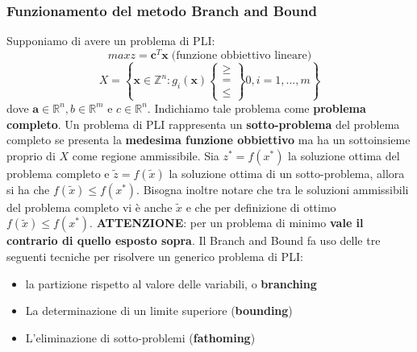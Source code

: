 \documentclass[12pt]{article}
\begin{document}
\subsubsection{Funzionamento del metodo Branch and Bound}
Supponiamo di avere un problema di PLI:
$$max z = \boldsymbol{c}^T\boldsymbol{x} \; \textrm{(funzione obbiettivo lineare)}$$
$$X = \left \{ \boldsymbol{x} \in \mathbb{Z}^n : g_i(\boldsymbol{x}) \begin{Bmatrix}
    \geq \\
    = \\
    \leq
\end{Bmatrix} 0, i = 1,...,m \right \}$$
dove $\boldsymbol{a} \in \mathbb{R}^n, b \in \mathbb{R}^m$ e $c \in \mathbb{R}^n$. \newline
Indichiamo tale problema come \textbf{problema completo}. Un problema di PLI rappresenta un \textbf{sotto-problema} del problema completo se presenta la
\textbf{medesima funzione obbiettivo} ma ha un sottoinsieme proprio di $X$ come regione ammissibile.
Sia $z^* = f(x^*)$ la soluzione ottima del problema completo e $\tilde{z} = f(\tilde{x})$ la soluzione ottima di un sotto-problema,
allora si ha che $f(\tilde{x}) \leq f(x^*)$. Bisogna inoltre notare che tra le soluzioni ammissibili del problema completo vi è anche $\tilde{x}$ e che per definizione
di ottimo $f(\tilde{x}) \leq f(x^*)$. \newline
\textbf{ATTENZIONE}: per un problema di minimo \textbf{vale il contrario di quello esposto sopra}. \newline
Il Branch and Bound fa uso delle tre seguenti tecniche per risolvere un generico problema di PLI:
\begin{itemize}
    \item la partizione rispetto al valore delle variabili, o \textbf{branching}
    \item La determinazione di un limite superiore (\textbf{bounding})
    \item L'eliminazione di sotto-problemi (\textbf{fathoming})
\end{itemize}
\end{document}
